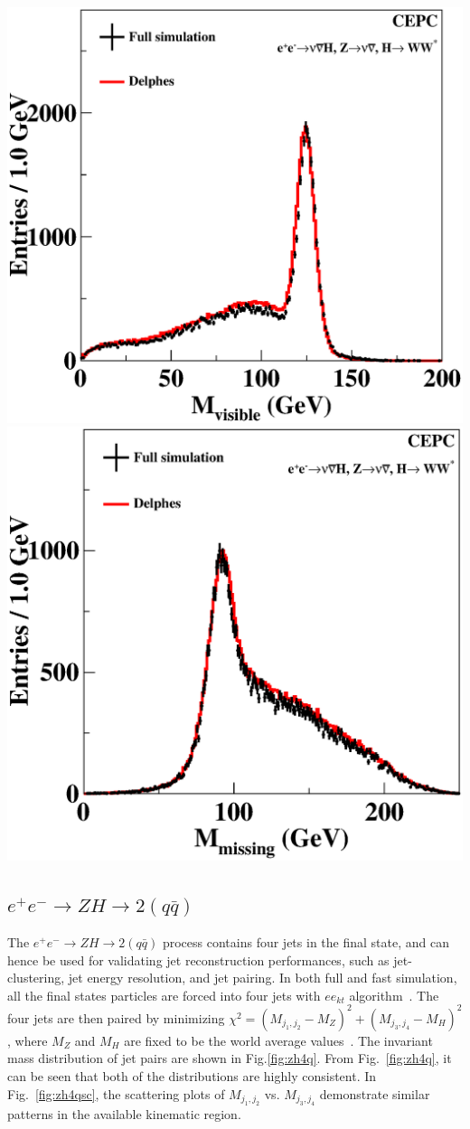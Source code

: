 \documentclass[a4paper,10pt,twoside]{cpc-hepnp}
\begin{document}
\begin{multicols}{2}
\begin{center}
\includegraphics[width=0.49\linewidth]{figs/nnh_mass}
\includegraphics[width=0.49\linewidth]{figs/nnh_reco}
\end{center}

\subsection{$e^+e^- \to ZH \to 2(q\bar{q})$}

The $e^+e^- \to ZH \to 2(q\bar{q})$ process contains four jets in the final state, and can hence be used for validating jet reconstruction performances, such as jet-clustering, jet energy resolution, and jet pairing.
In both full and fast simulation, all the final states particles are forced into four jets with $ee_{kt}$ algorithm~\cite{ref:eekt}.
The four jets are then paired by minimizing $\chi^2 = (M_{j_1,j_2} - M_Z)^2 + (M_{j_3,j_4}-M_H)^2$,
where $M_Z$ and $M_H$ are fixed to be the world average values~\cite{ref:PDG}. 
The invariant mass distribution of jet pairs are shown in Fig.\ref{fig:zh4q}.
From Fig.~\ref{fig:zh4q}, it can be seen that both of the distributions are highly consistent.
In Fig.~\ref{fig:zh4qsc}, the scattering plots of $M_{j_1,j_2}$  vs. $M_{j_3,j_4}$ 
demonstrate similar patterns in the available kinematic region.


\end{multicols}
\end{document}
